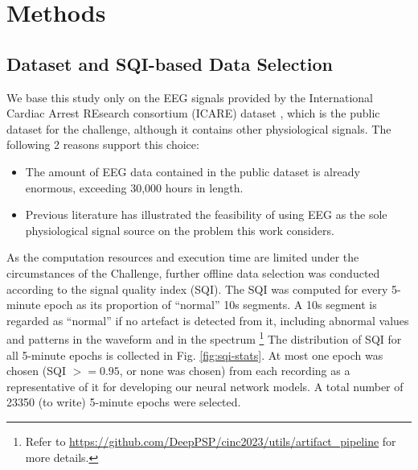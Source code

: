\section{Methods}
\label{sec:methods}


\subsection{Dataset and SQI-based Data Selection}
\label{subsec:data-selection}

We base this study only on the EEG signals provided by the International Cardiac Arrest REsearch consortium (ICARE) dataset \cite{ICAREDatabase}, which is the public dataset for the challenge, although it contains other physiological signals. The following 2 reasons support this choice:
\begin{itemize}
    \item The amount of EEG data contained in the public dataset is already enormous, exceeding 30,000 hours in length.
    \item Previous literature \cite{Zheng_2021_coma} has illustrated the feasibility of using EEG as the sole physiological signal source on the problem this work considers.
\end{itemize}

As the computation resources and execution time are limited under the circumstances of the Challenge, further offline data selection was conducted according to the signal quality index (SQI). The SQI was computed for every 5-minute epoch as its proportion of ``normal'' 10s segments. A 10s segment is regarded as ``normal'' if no artefact is detected from it, including abnormal values and patterns in the waveform and in the spectrum \footnote{Refer to \url{https://github.com/DeepPSP/cinc2023/utils/artifact_pipeline} for more details.} The distribution of SQI for all 5-minute epochs is collected in Fig. \ref{fig:sqi-stats}. At most one epoch was chosen (SQI $>= 0.95$, or none was chosen) from each recording as a representative of it for developing our neural network models. A total number of 23350 (to write) 5-minute epochs were selected.

